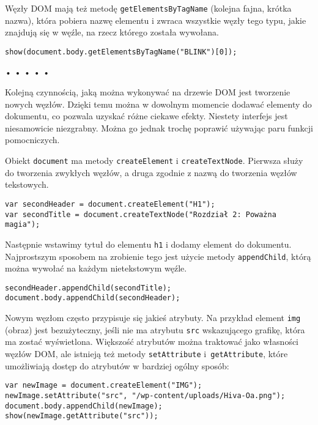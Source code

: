Węzły DOM mają też metodę \texttt{getElementsByTagName} (kolejna fajna, krótka nazwa), która pobiera nazwę elementu i zwraca wszystkie węzły tego typu, jakie znajdują się w węźle, na rzecz którego została wywołana.

  
\begin{verbatim} 
show(document.body.getElementsByTagName("BLINK")[0]);
\end{verbatim}


\begin{center}
• • • • •
\end{center}

  
Kolejną czynnością, jaką można wykonywać na drzewie DOM jest tworzenie nowych węzłów. Dzięki temu można w dowolnym momencie dodawać elementy do dokumentu, co pozwala uzyskać różne ciekawe efekty. Niestety interfejs jest niesamowicie niezgrabny. Można go jednak trochę poprawić używając paru funkcji pomocniczych.

  
Obiekt \texttt{document} ma metody \texttt{createElement} i \texttt{createTextNode}. Pierwsza służy do tworzenia zwykłych węzłów, a druga zgodnie z nazwą do tworzenia węzłów tekstowych.

  
\begin{verbatim} 
var secondHeader = document.createElement("H1");
var secondTitle = document.createTextNode("Rozdział 2: Poważna magia");
\end{verbatim}
  
Następnie wstawimy tytuł do elementu \texttt{h1} i dodamy element do dokumentu. Najprostszym sposobem na zrobienie tego jest użycie metody \texttt{appendChild}, którą można wywołać na każdym nietekstowym węźle.

  
\begin{verbatim} 
secondHeader.appendChild(secondTitle);
document.body.appendChild(secondHeader);
\end{verbatim}
  
Nowym węzłom często przypisuje się jakieś atrybuty. Na przykład element \texttt{img} (obraz) jest bezużyteczny, jeśli nie ma atrybutu \texttt{src} wskazującego grafikę, która ma zostać wyświetlona. Większość atrybutów można traktować jako własności węzłów DOM, ale istnieją też metody \texttt{setAttribute} i~\texttt{getAttribute}, które umożliwiają dostęp do atrybutów w bardziej ogólny sposób:

  
\begin{verbatim} 
var newImage = document.createElement("IMG");
newImage.setAttribute("src", "/wp-content/uploads/Hiva-Oa.png");
document.body.appendChild(newImage);
show(newImage.getAttribute("src"));
\end{verbatim}



